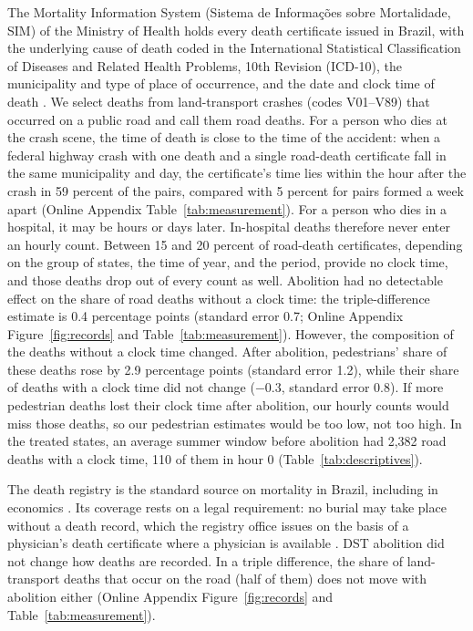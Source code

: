The Mortality Information System (Sistema de Informa\c{c}\~oes sobre Mortalidade, SIM) of the Ministry of Health holds every death certificate issued in Brazil, with the underlying cause of death coded in the International Statistical Classification of Diseases and Related Health Problems, 10th Revision (ICD-10), the municipality and type of place of occurrence, and the date and clock time of death \citep{datasus2025sim}. We select deaths from land-transport crashes (codes V01--V89) that occurred on a public road and call them road deaths. For a person who dies at the crash scene, the time of death is close to the time of the accident: when a federal highway crash with one death and a single road-death certificate fall in the same municipality and day, the certificate's time lies within the hour after the crash in 59 percent of the pairs, compared with 5 percent for pairs formed a week apart (Online Appendix Table~\ref{tab:measurement}). For a person who dies in a hospital, it may be hours or days later. In-hospital deaths therefore never enter an hourly count. Between 15 and 20 percent of road-death certificates, depending on the group of states, the time of year, and the period, provide no clock time, and those deaths drop out of every count as well. %
Abolition had no detectable effect on the share of road deaths without a clock time: the triple-difference estimate is 0.4 percentage points (standard error 0.7; Online Appendix Figure~\ref{fig:records} and Table~\ref{tab:measurement}). %
However, the composition of the deaths without a clock time changed. After abolition, pedestrians' share of these deaths rose by 2.9 percentage points (standard error 1.2), while their share of deaths with a clock time did not change ($-0.3$, standard error 0.8). If more pedestrian deaths lost their clock time after abolition, our hourly counts would miss those deaths, so our pedestrian estimates would be too low, not too high. %
In the treated states, an average summer window before abolition had 2,382 road deaths with a clock time, 110 of them in hour 0 (Table~\ref{tab:descriptives}).

The death registry is the standard source on mortality in Brazil, including in economics \citep[for example,][]{dixcarneiro2018economic}. Its coverage rests on a legal requirement: no burial may take place without a death record, which the registry office issues on the basis of a physician's death certificate where a physician is available \citep[art.~77]{brasil1973lei}. DST abolition did not change how deaths are recorded. In a triple difference, the share of land-transport deaths that occur on the road (half of them) does not move with abolition either (Online Appendix Figure~\ref{fig:records} and Table~\ref{tab:measurement}).

